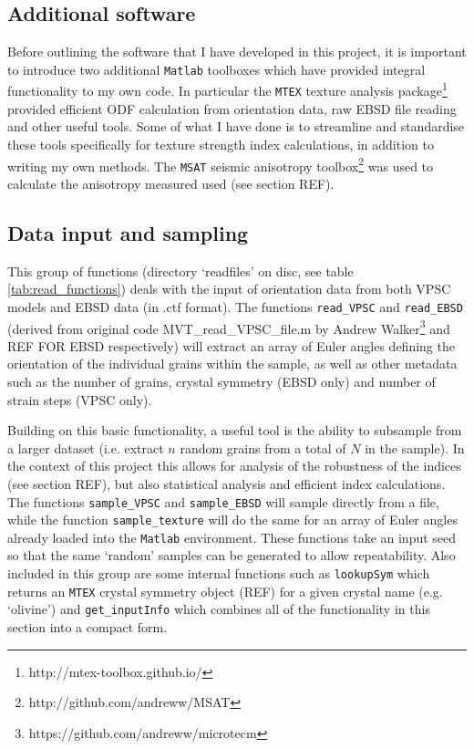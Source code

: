 \documentclass[a4paper,12pt]{report}
\numberwithin{equation}{chapter}
\begin{document}
\subsection{Additional software}
Before outlining the software that I have developed in this project, it is important to introduce two additional \texttt{Matlab} toolboxes which have provided integral functionality to my own code. In particular the \texttt{MTEX} texture analysis package\footnote{http://mtex-toolbox.github.io/} \citep{Bachmann2010,Mainprice} provided efficient ODF calculation from orientation data, raw EBSD file reading and other useful tools. Some of what I have done is to streamline and standardise these tools specifically for texture strength index calculations, in addition to writing my own methods. The \texttt{MSAT} seismic anisotropy toolbox\footnote{http://github.com/andreww/MSAT} was used to calculate the anisotropy measured used (see section REF).    

\subsection{Data input and sampling}

This group of functions (directory \lq{}readfiles\rq{} on disc, see table \ref{tab:read_functions}) deals with the input of orientation data from both VPSC models and EBSD data (in .ctf format). The functions \texttt{read\_{}VPSC} and \texttt{read\_{}EBSD} (derived from original code MVT\_{}read\_{}VPSC\_{}file.m by Andrew Walker\footnote{https://github.com/andreww/microtecm} and REF FOR EBSD respectively) will extract an array of Euler angles defining the orientation of the individual grains within the sample, as well as other metadata such as the number of grains, crystal symmetry (EBSD only) and number of strain steps (VPSC only).                                                

Building on this basic functionality, a useful tool is the ability to subsample from a larger dataset (i.e. extract $n$ random grains from a total of $N$ in the sample). In the context of this project this allows for analysis of the robustness of the indices (see section REF), but also statistical analysis and efficient index calculations. The functions \texttt{sample\_{}VPSC} and \texttt{sample\_{}EBSD} will sample directly from a file, while the function \texttt{sample\_{}texture} will do the same for an array of Euler angles already loaded into the \texttt{Matlab} environment. These functions take an input seed so that the same \lq{}random\rq{} samples can be generated to allow repeatability. Also included in this group are some internal functions such as \texttt{lookupSym} which returns an \texttt{MTEX} crystal symmetry object (REF) for a given crystal name (e.g. \lq{}olivine\rq{}) and \texttt{get\_{}inputInfo} which combines all of the functionality in this section into a compact form.                                                                                                                            
\end{document}
